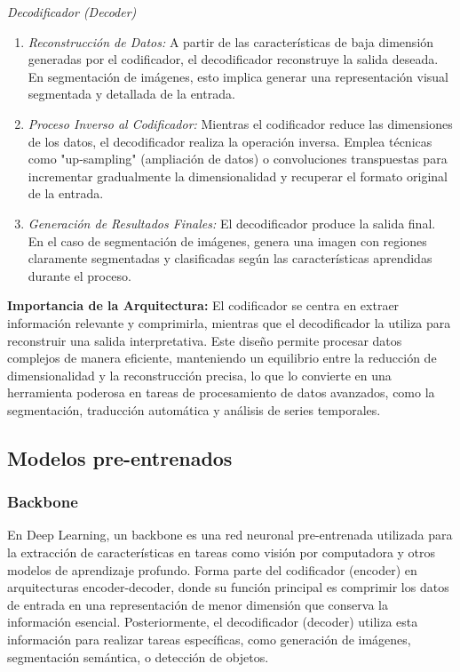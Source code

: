 \textit{Decodificador (Decoder)}

\begin{enumerate}

    \item \emph{Reconstrucción de Datos:} A partir de las características de baja dimensión generadas por el codificador, el decodificador reconstruye la salida deseada. En segmentación de imágenes, esto implica generar una representación visual segmentada y detallada de la entrada.
    
    \item \emph{Proceso Inverso al Codificador:} Mientras el codificador reduce las dimensiones de los datos, el decodificador realiza la operación inversa. Emplea técnicas como "up-sampling" (ampliación de datos) o convoluciones transpuestas para incrementar gradualmente la dimensionalidad y recuperar el formato original de la entrada.
    
    \item \emph{Generación de Resultados Finales:} El decodificador produce la salida final. En el caso de segmentación de imágenes, genera una imagen con regiones claramente segmentadas y clasificadas según las características aprendidas durante el proceso.

\end{enumerate}

\textbf{Importancia de la Arquitectura:}  El codificador se centra en extraer información relevante y comprimirla, mientras que el decodificador la utiliza para reconstruir una salida interpretativa. Este diseño permite procesar datos complejos de manera eficiente, manteniendo un equilibrio entre la reducción de dimensionalidad y la reconstrucción precisa, lo que lo convierte en una herramienta poderosa en tareas de procesamiento de datos avanzados, como la segmentación, traducción automática y análisis de series temporales.

\subsection{Modelos pre-entrenados}

\subsubsection{Backbone}
En Deep Learning, un backbone es una red neuronal pre-entrenada utilizada para la extracción de características en tareas como visión por computadora y otros modelos de aprendizaje profundo. Forma parte del codificador (encoder) en arquitecturas encoder-decoder, donde su función principal es comprimir los datos de entrada en una representación de menor dimensión que conserva la información esencial. Posteriormente, el decodificador (decoder) utiliza esta información para realizar tareas específicas, como generación de imágenes, segmentación semántica, o detección de objetos.


